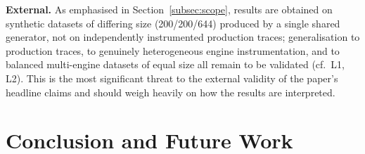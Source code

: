 \documentclass[iicol,pdflatex,sn-mathphys-num]{sn-jnl}
\theoremstyle{thmstyleone}
\theoremstyle{thmstylethree}
\begin{document}
\textbf{External.} As emphasised in Section~\ref{subsec:scope}, results
are obtained on synthetic datasets of differing size (200/200/644)
produced by a single shared generator, not on independently
instrumented production traces; generalisation to production traces,
to genuinely heterogeneous engine instrumentation, and to balanced
multi-engine datasets of equal size all remain to be validated (cf.\
L1, L2). This is the most significant threat to the external validity
of the paper's headline claims and should weigh heavily on how the
results are interpreted.

\section{Conclusion and Future Work}\label{sec:conclusion}
\end{document}
